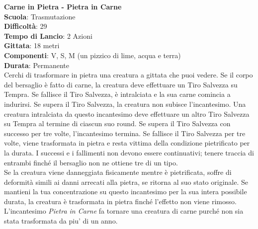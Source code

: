 \begin{multicols}{2}
\medskip\textbf{Carne in Pietra - Pietra in Carne}\\
\textbf{Scuola}: Trasmutazione\\
\textbf{Difficoltà}: 29\\
\textbf{Tempo di Lancio}: 2 Azioni\\
\textbf{Gittata}: 18 metri\\
\textbf{Componenti}: V, S, M (un pizzico di lime, acqua e terra)\\
\textbf{Durata}: Permanente\\
Cerchi di trasformare in pietra una creatura a gittata che puoi vedere. Se il corpo del bersaglio è fatto di carne, la creatura deve effettuare un Tiro Salvezza su Tempra. Se fallisce il Tiro Salvezza, è intralciata e la sua carne comincia a indurirsi. Se supera il Tiro Salvezza, la creatura non subisce l'incantesimo. Una creatura intralciata da questo incantesimo deve effettuare un altro Tiro Salvezza su Tempra al termine di ciascun suo round. Se supera il Tiro Salvezza con successo per tre volte, l'incantesimo termina. Se fallisce il Tiro Salvezza per tre volte, viene trasformata in pietra e resta vittima della condizione pietrificato per la durata. I successi e i fallimenti non devono essere continuativi; tenere traccia di entrambi finché il bersaglio non ne ottiene tre di un tipo.\\
Se la creatura viene danneggiata fisicamente mentre è pietrificata, soffre di deformità simili ai danni arrecati alla pietra, se ritorna al suo stato originale. Se mantieni la tua concentrazione su questo incantesimo per la sua intera possibile durata, la creatura è trasformata in pietra finché l'effetto non viene rimosso.\\
L'incantesimo \emph{Pietra in Carne} fa tornare una creatura di carne purché non sia stata trasformata da piu' di un anno.\\



\end{multicols}
